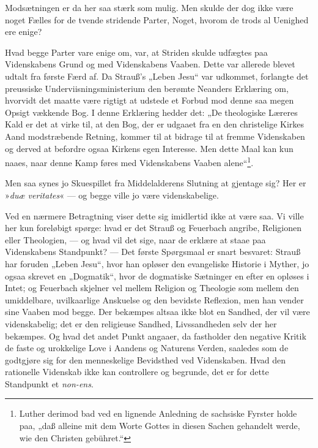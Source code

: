 \documentclass[12pt,a4paper]{book}
\newcommand{\opage}[1]{\marginnote{\footnotesize\textit{[#1]}}}
\begin{document}
Modsætningen er da her saa stærk som mulig. Men skulde der dog ikke være
noget Fælles for de tvende stridende Parter, Noget, hvorom de trods al
Uenighed ere enige?

Hvad begge Parter vare enige om, var, at Striden skulde udfægtes paa
Videnskabens Grund og med Videnskabens Vaaben. Dette var allerede blevet
udtalt fra første Færd af. Da Strauß's „Leben Jesu“ var udkommet, forlangte
det preussiske Underviisningsministerium den berømte Neanders Erklæring om,
hvorvidt det maatte være rigtigt at udstede et Forbud mod denne saa megen
Opsigt vækkende Bog. I denne Erklæring hedder det: „De theologiske Læreres
Kald er det at virke til, at den Bog, der er udgaaet fra en den christelige
Kirkes Aand modstræbende Retning, kommer til at bidrage til at fremme
Videnskaben og derved at befordre ogsaa Kirkens egen Interesse. Men dette
Maal kan kun naaes, naar denne Kamp føres med Videnskabens Vaaben
alene“\footnote{Luther derimod bad ved en lignende Anledning de sachsiske
Fyrster holde paa, „daß alleine mit dem Worte Gottes in diesen Sachen
gehandelt werde, wie den Christen gebühret.“}.

Men saa synes jo Skuespillet fra Middelalderens Slutning at gjentage sig?
Her er »\textit{duæ veritates}« --- og begge ville jo være videnskabelige.

Ved en nærmere Betragtning viser dette sig imidlertid ikke at være saa. Vi
ville her kun foreløbigt spørge: hvad er det Strauß og Feuerbach angribe,
Religionen eller Theologien, --- og hvad vil det sige, naar de erklære at
staae paa Videnskabens Standpunkt? --- Det første Spørgsmaal er snart
besvaret:
\opage{18}\setcounter{footnote}{0}%
Strauß har foruden „Leben Jesu“, hvor han opløser den evangeliske Historie i
Myther, jo ogsaa skrevet en „Dogmatik“, hvor de dogmatiske Sætninger en
efter en opløses i Intet; og Feuerbach skjelner vel mellem Religion og
Theologie som mellem den umiddelbare, uvilkaarlige Anskuelse og den bevidste
Reflexion, men han vender sine Vaaben mod begge. Der bekæmpes altsaa ikke
blot en Sandhed, der vil være videnskabelig; det er den religieuse Sandhed,
Livssandheden selv der her bekæmpes. Og hvad det andet Punkt angaaer, da
fastholder den negative Kritik de faste og urokkelige Love i Aandens og
Naturens Verden, saaledes som de godtgjøre sig for den menneskelige
Bevidsthed ved Videnskaben. Hvad den rationelle Videnskab ikke kan
controllere og begrunde, det er for dette Standpunkt et \textit{non-ens}.
\end{document}
